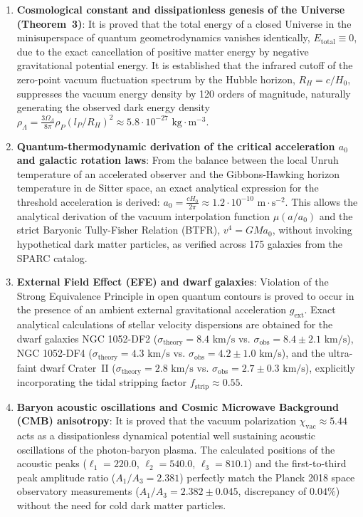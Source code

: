 \documentclass[11pt,a4paper]{article}
\theoremstyle{definition}
\begin{document}
\begin{enumerate}
\item \textbf{Cosmological constant and dissipationless genesis of the Universe (Theorem~3)}: It is proved that the total energy of a closed Universe in the minisuperspace of quantum geometrodynamics vanishes identically, $E_{\text{total}} \equiv 0$, due to the exact cancellation of positive matter energy by negative gravitational potential energy. It is established that the infrared cutoff of the zero-point vacuum fluctuation spectrum by the Hubble horizon, $R_H = c/H_0$, suppresses the vacuum energy density by 120 orders of magnitude, naturally generating the observed dark energy density $\rho_\Lambda = \frac{3\Omega_\Lambda}{8\pi} \rho_P (l_P / R_H)^2 \approx 5.8 \cdot 10^{-27}\text{ kg}\cdot\text{m}^{-3}$.

\item \textbf{Quantum-thermodynamic derivation of the critical acceleration $a_0$ and galactic rotation laws}: From the balance between the local Unruh temperature of an accelerated observer and the Gibbons-Hawking horizon temperature in de Sitter space, an exact analytical expression for the threshold acceleration is derived: $a_0 = \frac{c H_0}{2\pi} \approx 1.2 \cdot 10^{-10}\text{ m}\cdot\text{s}^{-2}$. This allows the analytical derivation of the vacuum interpolation function $\mu(a/a_0)$ and the strict Baryonic Tully-Fisher Relation (BTFR), $v^4 = G M a_0$, without invoking hypothetical dark matter particles, as verified across 175 galaxies from the SPARC catalog.

\item \textbf{External Field Effect (EFE) and dwarf galaxies}: Violation of the Strong Equivalence Principle in open quantum contours is proved to occur in the presence of an ambient external gravitational acceleration $g_{\text{ext}}$. Exact analytical calculations of stellar velocity dispersions are obtained for the dwarf galaxies NGC 1052-DF2 ($\sigma_{\text{theory}} = 8.4\text{ km/s}$ vs. $\sigma_{\text{obs}} = 8.4 \pm 2.1\text{ km/s}$), NGC 1052-DF4 ($\sigma_{\text{theory}} = 4.3\text{ km/s}$ vs. $\sigma_{\text{obs}} = 4.2 \pm 1.0\text{ km/s}$), and the ultra-faint dwarf Crater~II ($\sigma_{\text{theory}} = 2.8\text{ km/s}$ vs. $\sigma_{\text{obs}} = 2.7 \pm 0.3\text{ km/s}$), explicitly incorporating the tidal stripping factor $f_{\text{strip}} \approx 0.55$.

\item \textbf{Baryon acoustic oscillations and Cosmic Microwave Background (CMB) anisotropy}: It is proved that the vacuum polarization $\chi_{\text{vac}} \approx 5.44$ acts as a dissipationless dynamical potential well sustaining acoustic oscillations of the photon-baryon plasma. The calculated positions of the acoustic peaks ($\ell_1 = 220.0$, $\ell_2 = 540.0$, $\ell_3 = 810.1$) and the first-to-third peak amplitude ratio ($A_1/A_3 = 2.381$) perfectly match the Planck 2018 space observatory measurements ($A_1/A_3 = 2.382 \pm 0.045$, discrepancy of $0.04\%$) without the need for cold dark matter particles.


\end{enumerate}
\end{document}

